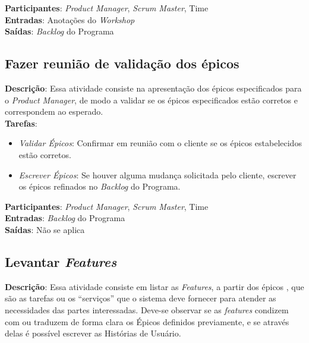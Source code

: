   \textbf{Participantes}: \textit{Product Manager}, \textit{Scrum Master}, Time \\
  
  \textbf{Entradas}: Anotações do \textit{Workshop} \\
  
  \textbf{Saídas}: \textit{Backlog} do Programa \\

\subsection{Fazer reunião de validação dos épicos}
  \textbf{Descrição}: Essa atividade consiste na apresentação dos épicos especificados para o \textit{Product Manager}, de modo a validar se os épicos 
  especificados estão corretos e correspondem ao esperado. \\
  
  \textbf{Tarefas}: 
  
  \begin{itemize}
    \item \indent \textit{Validar Épicos}: Confirmar em reunião com o cliente se os épicos estabelecidos estão corretos.
   
   \item \indent \textit{Escrever Épicos}: Se houver alguma mudança solicitada pelo cliente, escrever os épicos 
   refinados no \textit{Backlog} do Programa.
  \end{itemize}
 
  \textbf{Participantes}: \textit{Product Manager}, \textit{Scrum Master}, Time \\
  
  \textbf{Entradas}: \textit{Backlog} do Programa \\
  
  \textbf{Saídas}:  Não se aplica\\

\subsection{Levantar \textit{Features}}
\textbf{Descrição}: Essa atividade consiste em listar as \textit{Features}, a partir dos épicos , 
que são as tarefas ou os “serviços” que o sistema deve fornecer para atender as necessidades das partes interessadas.
Deve-se observar se as \textit{features} condizem com ou traduzem de forma clara os Épicos 
definidos previamente, e se através delas é possível escrever as Histórias de Usuário.\\

